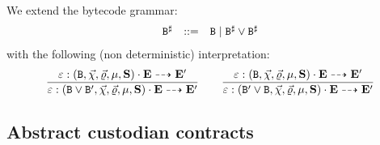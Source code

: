 \documentclass[14pt]{extarticle}
\begin{document}
We extend the bytecode grammar:
$$\begin{array}{lcll}
{\mathtt{B}^\sharp} &:: =& \mathtt{B} \mid {\mathtt{B}^\sharp}\vee {\mathtt{B}^\sharp}
\end{array}
$$
with the following (non deterministic) interpretation:
$$
\begin{array}{c}
\dfrac{\varepsilon:(\mathtt{B},\vec{\chi},\vec{\varrho},\mu,\mathbf{S})\cdot\mathbf{E}\dashrightarrow \mathbf{E}'}
{\varepsilon:(\mathtt{B}\vee \mathtt{B}',\vec{\chi},\vec{\varrho},\mu,\mathbf{S})\cdot\mathbf{E}\dashrightarrow \mathbf{E}'}
\qquad
\dfrac{\varepsilon:(\mathtt{B},\vec{\chi},\vec{\varrho},\mu,\mathbf{S})\cdot\mathbf{E}\dashrightarrow \mathbf{E}'}
{\varepsilon:(\mathtt{B}'\vee \mathtt{B},\vec{\chi},\vec{\varrho},\mu,\mathbf{S})\cdot\mathbf{E}\dashrightarrow \mathbf{E}'}
\end{array}
$$

\subsection{Abstract custodian contracts}
\end{document}
